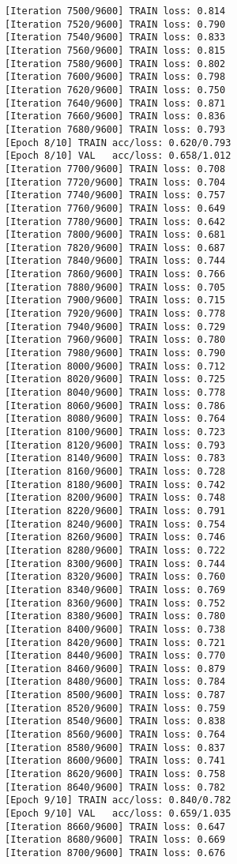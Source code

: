 \documentclass[11pt]{article}
\begin{document}
\begin{Verbatim}[commandchars=\\\{\}]
[Iteration 7500/9600] TRAIN loss: 0.814
[Iteration 7520/9600] TRAIN loss: 0.790
[Iteration 7540/9600] TRAIN loss: 0.833
[Iteration 7560/9600] TRAIN loss: 0.815
[Iteration 7580/9600] TRAIN loss: 0.802
[Iteration 7600/9600] TRAIN loss: 0.798
[Iteration 7620/9600] TRAIN loss: 0.750
[Iteration 7640/9600] TRAIN loss: 0.871
[Iteration 7660/9600] TRAIN loss: 0.836
[Iteration 7680/9600] TRAIN loss: 0.793
[Epoch 8/10] TRAIN acc/loss: 0.620/0.793
[Epoch 8/10] VAL   acc/loss: 0.658/1.012
[Iteration 7700/9600] TRAIN loss: 0.708
[Iteration 7720/9600] TRAIN loss: 0.704
[Iteration 7740/9600] TRAIN loss: 0.757
[Iteration 7760/9600] TRAIN loss: 0.649
[Iteration 7780/9600] TRAIN loss: 0.642
[Iteration 7800/9600] TRAIN loss: 0.681
[Iteration 7820/9600] TRAIN loss: 0.687
[Iteration 7840/9600] TRAIN loss: 0.744
[Iteration 7860/9600] TRAIN loss: 0.766
[Iteration 7880/9600] TRAIN loss: 0.705
[Iteration 7900/9600] TRAIN loss: 0.715
[Iteration 7920/9600] TRAIN loss: 0.778
[Iteration 7940/9600] TRAIN loss: 0.729
[Iteration 7960/9600] TRAIN loss: 0.780
[Iteration 7980/9600] TRAIN loss: 0.790
[Iteration 8000/9600] TRAIN loss: 0.712
[Iteration 8020/9600] TRAIN loss: 0.725
[Iteration 8040/9600] TRAIN loss: 0.778
[Iteration 8060/9600] TRAIN loss: 0.786
[Iteration 8080/9600] TRAIN loss: 0.764
[Iteration 8100/9600] TRAIN loss: 0.723
[Iteration 8120/9600] TRAIN loss: 0.793
[Iteration 8140/9600] TRAIN loss: 0.783
[Iteration 8160/9600] TRAIN loss: 0.728
[Iteration 8180/9600] TRAIN loss: 0.742
[Iteration 8200/9600] TRAIN loss: 0.748
[Iteration 8220/9600] TRAIN loss: 0.791
[Iteration 8240/9600] TRAIN loss: 0.754
[Iteration 8260/9600] TRAIN loss: 0.746
[Iteration 8280/9600] TRAIN loss: 0.722
[Iteration 8300/9600] TRAIN loss: 0.744
[Iteration 8320/9600] TRAIN loss: 0.760
[Iteration 8340/9600] TRAIN loss: 0.769
[Iteration 8360/9600] TRAIN loss: 0.752
[Iteration 8380/9600] TRAIN loss: 0.780
[Iteration 8400/9600] TRAIN loss: 0.738
[Iteration 8420/9600] TRAIN loss: 0.721
[Iteration 8440/9600] TRAIN loss: 0.770
[Iteration 8460/9600] TRAIN loss: 0.879
[Iteration 8480/9600] TRAIN loss: 0.784
[Iteration 8500/9600] TRAIN loss: 0.787
[Iteration 8520/9600] TRAIN loss: 0.759
[Iteration 8540/9600] TRAIN loss: 0.838
[Iteration 8560/9600] TRAIN loss: 0.764
[Iteration 8580/9600] TRAIN loss: 0.837
[Iteration 8600/9600] TRAIN loss: 0.741
[Iteration 8620/9600] TRAIN loss: 0.758
[Iteration 8640/9600] TRAIN loss: 0.782
[Epoch 9/10] TRAIN acc/loss: 0.840/0.782
[Epoch 9/10] VAL   acc/loss: 0.659/1.035
[Iteration 8660/9600] TRAIN loss: 0.647
[Iteration 8680/9600] TRAIN loss: 0.669
[Iteration 8700/9600] TRAIN loss: 0.676

\end{Verbatim}
\end{document}
